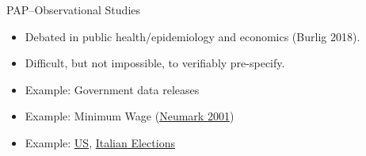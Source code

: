 \documentclass{beamer}
\begin{document}
{ %
    \begin{frame}[plain]
     \end{frame}
}
\begin{frame}{PAP--Observational Studies}
\begin{itemize}[<.->]
\item Debated in public health/epidemiology and economics (Burlig 2018).
\item Difficult, but not impossible, to verifiably pre-specify.
\item Example: Government data releases
\item Example: Minimum Wage (\href{http://onlinelibrary.wiley.com/doi/10.1111/0019-8676.00199/full}{Neumark 2001})
\item Example: \href{https://www.erpc2016.com/}{US}, \href{http://www.itanes.org/2016/11/21/2016-italian-constitutional-referendum-research-preacceptance-competition/}{Italian Elections}
\end{itemize}
\end{frame}
\end{document}
